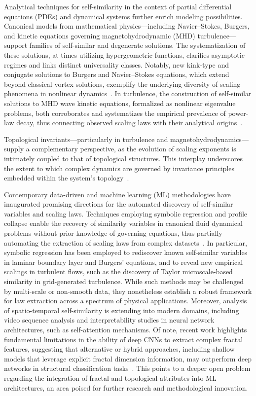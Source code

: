 \documentclass[sigconf]{acmart}
\begin{document}
Analytical techniques for self-similarity in the context of partial differential equations (PDEs) and dynamical systems further enrich modeling possibilities. Canonical models from mathematical physics—including Navier–Stokes, Burgers, and kinetic equations governing magnetohydrodynamic (MHD) turbulence—support families of self-similar and degenerate solutions. The systematization of these solutions, at times utilizing hypergeometric functions, clarifies asymptotic regimes and links distinct universality classes. Notably, new kink-type and conjugate solutions to Burgers and Navier–Stokes equations, which extend beyond classical vortex solutions, exemplify the underlying diversity of scaling phenomena in nonlinear dynamics~\cite{ref67,ref64}. In turbulence, the construction of self-similar solutions to MHD wave kinetic equations, formalized as nonlinear eigenvalue problems, both corroborates and systematizes the empirical prevalence of power-law decay, thus connecting observed scaling laws with their analytical origins~\cite{ref60}.

Topological invariants—particularly in turbulence and magnetohydrodynamics—supply a complementary perspective, as the evolution of scaling exponents is intimately coupled to that of topological structures. This interplay underscores the extent to which complex dynamics are governed by invariance principles embedded within the system's topology~\cite{ref60}.

Contemporary data-driven and machine learning (ML) methodologies have inaugurated promising directions for the automated discovery of self-similar variables and scaling laws. Techniques employing symbolic regression and profile collapse enable the recovery of similarity variables in canonical fluid dynamical problems without prior knowledge of governing equations, thus partially automating the extraction of scaling laws from complex datasets~\cite{ref65}. In particular, symbolic regression has been employed to rediscover known self-similar variables in laminar boundary layer and Burgers' equations, and to reveal new empirical scalings in turbulent flows, such as the discovery of Taylor microscale-based similarity in grid-generated turbulence. While such methods may be challenged by multi-scale or non-smooth data, they nonetheless establish a robust framework for law extraction across a spectrum of physical applications. Moreover, analysis of spatio-temporal self-similarity is extending into modern domains, including video sequence analysis and interpretability studies in neural network architectures, such as self-attention mechanisms. Of note, recent work highlights fundamental limitations in the ability of deep CNNs to extract complex fractal features, suggesting that alternative or hybrid approaches, including shallow models that leverage explicit fractal dimension information, may outperform deep networks in structural classification tasks~\cite{ref39}. This points to a deeper open problem regarding the integration of fractal and topological attributes into ML architectures, an area poised for further research and methodological innovation.
\end{document}
